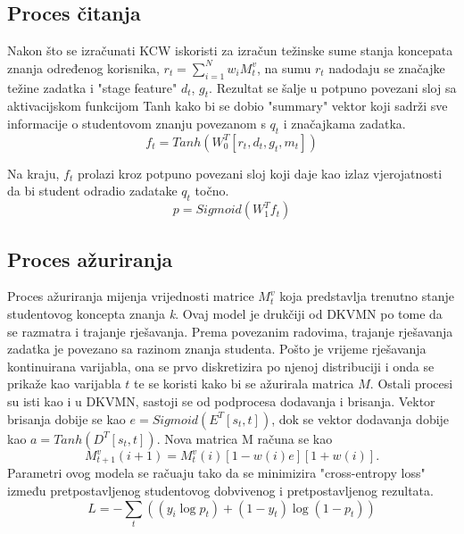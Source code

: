 \subsection{Proces čitanja}


Nakon što se izračunati KCW iskoristi za izračun težinske sume stanja koncepata znanja određenog korisnika, $r_t=\sum_{i=1}^{N}w_iM^v_t$, na sumu $r_t$ nadodaju se značajke težine zadatka i "stage feature" $d_t$, $g_t$. Rezultat se šalje u potpuno povezani sloj sa aktivacijskom funkcijom Tanh kako bi se dobio "summary" vektor koji sadrži sve informacije o studentovom znanju povezanom s $q_t$ i značajkama zadatka.
\begin{equation}
	f_t=Tanh(W_0^T[r_t,d_t,g_t,m_t])
\end{equation}

Na kraju, $f_t$ prolazi kroz potpuno povezani sloj koji daje kao izlaz vjerojatnosti da bi student odradio zadatake $q_t$ točno.
\begin{equation}
p=Sigmoid(W^T_1f_t)
\end{equation}


\subsection{Proces ažuriranja}

Proces ažuriranja mijenja vrijednosti matrice $M^v_t$ koja predstavlja trenutno stanje studentovog koncepta znanja \textit{k}.
Ovaj model je drukčiji od DKVMN po tome da se razmatra i trajanje rješavanja. Prema povezanim radovima, trajanje rješavanja zadatka je povezano sa razinom znanja studenta. Pošto je vrijeme rješavanja kontinuirana varijabla, ona se prvo diskretizira po njenoj distribuciji i onda se prikaže kao varijabla $t$ te se koristi kako bi se ažurirala matrica $M$. Ostali procesi su isti kao i u DKVMN, sastoji se od podprocesa dodavanja i brisanja. Vektor brisanja dobije se kao $e=Sigmoid(E^T[s_t,t])$, dok se vektor dodavanja dobije kao $a=Tanh(D^T[s_t,t])$. Nova matrica M računa se kao
\begin{equation}
	M^v_{t+1}(i+1) =M^v_t (i)[1-w(i)e][1+w(i)].
\end{equation}
Parametri ovog modela se račuaju tako da se minimizira "cross-entropy loss" između pretpostavljenog studentovog
dobvivenog i pretpostavljenog rezultata. 
\begin{equation}
	L=-\sum_t ((y_i \log p_t ) + (1-y_t)\log (1-p_t))
\end{equation}






